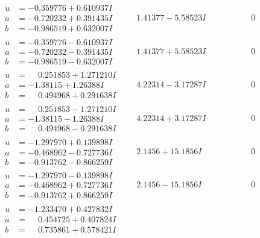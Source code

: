 \documentclass[1p]{elsarticle_modified}
\theoremstyle{definition}
\begin{document}
$$\begin{array}{c|c|c}
\begin{aligned}
u &= -0.359776 + 0.610937 I \\
a &= -0.720232 + 0.391435 I \\
b &= -0.986519 + 0.632007 I\end{aligned}
 & \phantom{-}1.41377 - 5.58523 I & \phantom{-0.000000 } 0 \\ \hline\begin{aligned}
u &= -0.359776 - 0.610937 I \\
a &= -0.720232 - 0.391435 I \\
b &= -0.986519 - 0.632007 I\end{aligned}
 & \phantom{-}1.41377 + 5.58523 I & \phantom{-0.000000 } 0 \\ \hline\begin{aligned}
u &= \phantom{-}0.251853 + 1.271210 I \\
a &= -1.38115 + 1.26388 I \\
b &= \phantom{-}0.494968 + 0.291638 I\end{aligned}
 & \phantom{-}4.22314 - 3.17287 I & \phantom{-0.000000 } 0 \\ \hline\begin{aligned}
u &= \phantom{-}0.251853 - 1.271210 I \\
a &= -1.38115 - 1.26388 I \\
b &= \phantom{-}0.494968 - 0.291638 I\end{aligned}
 & \phantom{-}4.22314 + 3.17287 I & \phantom{-0.000000 } 0 \\ \hline\begin{aligned}
u &= -1.297970 + 0.139898 I \\
a &= -0.468962 - 0.727736 I \\
b &= -0.913762 - 0.866259 I\end{aligned}
 & \phantom{-}2.1456 + 15.1856 I & \phantom{-0.000000 } 0 \\ \hline\begin{aligned}
u &= -1.297970 - 0.139898 I \\
a &= -0.468962 + 0.727736 I \\
b &= -0.913762 + 0.866259 I\end{aligned}
 & \phantom{-}2.1456 - 15.1856 I & \phantom{-0.000000 } 0 \\ \hline\begin{aligned}
u &= -1.233470 + 0.427832 I \\
a &= \phantom{-}0.454725 + 0.407824 I \\
b &= \phantom{-}0.735861 + 0.578421 I\end{aligned}

\end{array}$$
\end{document}
